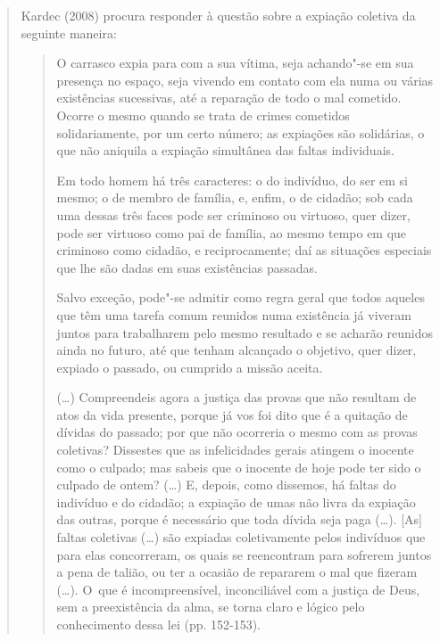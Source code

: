 {\begin{quote}
Kardec (2008) procura responder à questão sobre a expiação coletiva da
seguinte maneira:

\begin{quote}
O carrasco expia para com a sua vítima, seja achando"-se em sua presença
no espaço, seja vivendo em contato com ela numa ou várias existências
sucessivas, até a reparação de todo o mal cometido. Ocorre o mesmo
quando se trata de crimes cometidos solidariamente, por um certo número;
as expiações são solidárias, o que não aniquila a expiação simultânea
das faltas individuais.

Em todo homem há três caracteres: o do indivíduo, do ser em si mesmo; o
de membro de família, e, enfim, o de cidadão; sob cada uma dessas três
faces pode ser criminoso ou virtuoso, quer dizer, pode ser virtuoso como
pai de família, ao mesmo tempo em que criminoso como cidadão, e
reciprocamente; daí as situações especiais que lhe são dadas em suas
existências passadas.

Salvo exceção, pode"-se admitir como regra geral que todos aqueles que
têm uma tarefa comum reunidos numa existência já viveram juntos para
trabalharem pelo mesmo resultado e se acharão reunidos ainda no futuro,
até que tenham alcançado o objetivo, quer dizer, expiado o passado, ou
cumprido a missão aceita.

(\ldots{}) Compreendeis agora a justiça das provas que não resultam de
atos da vida presente, porque já vos foi dito que é a quitação de
dívidas do passado; por que não ocorreria o mesmo com as provas
coletivas? Dissestes que as infelicidades gerais atingem o inocente como
o culpado; mas sabeis que o inocente de hoje pode ter sido o culpado de
ontem? (\ldots{}) E, depois, como dissemos, há faltas do indivíduo e do
cidadão; a expiação de umas não livra da expiação das outras, porque é
necessário que toda dívida seja paga (\ldots{}). {[}As{]} faltas
coletivas (\ldots{}) são expiadas coletivamente pelos indivíduos que
para elas concorreram, os quais se reencontram para sofrerem juntos a
pena de talião, ou ter a ocasião de repararem o mal que fizeram
(\ldots{}). O~que é incompreensível, inconciliável com a justiça de
Deus, sem a preexistência da alma, se torna claro e lógico pelo
conhecimento dessa lei (pp. 152-153).
\end{quote}


\end{quote}}
